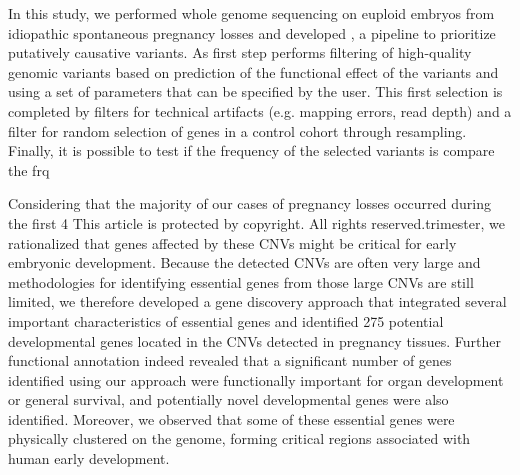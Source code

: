 In this study, we performed whole genome sequencing on euploid embryos from idiopathic spontaneous pregnancy losses and developed \gp\cite{gp2020}, a pipeline to prioritize putatively causative variants. As first step \gp performs filtering of high-quality genomic variants based on prediction of the functional effect of the variants and using a set of parameters that can be specified by the user. This first selection is completed by filters for technical artifacts (e.g. mapping errors, read depth) and a filter for random selection of genes in a control cohort through resampling. Finally, it is possible to test if the frequency of the selected variants is compare the frq  





Considering that the majority of our cases of pregnancy losses occurred during the first
4
This article is protected by copyright. All rights reserved.trimester, we rationalized that genes affected by these CNVs might be critical for early
embryonic development. Because the detected CNVs are often very large and methodologies
for identifying essential genes from those large CNVs are still limited, we therefore
developed a gene discovery approach that integrated several important characteristics of
essential genes and identified 275 potential developmental genes located in the CNVs
detected in pregnancy tissues. Further functional annotation indeed revealed that a significant
number of genes identified using our approach were functionally important for organ
development or general survival, and potentially novel developmental genes were also
identified. Moreover, we observed that some of these essential genes were physically
clustered on the genome, forming critical regions associated with human early development.


